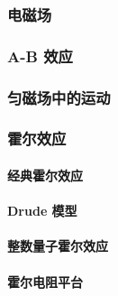 \documentclass[../../main.tex]{subfiles}
\begin{document}
\subsubsection{电磁场}
\subsubsection{A-B 效应}
\subsubsection{匀磁场中的运动}
\subsubsection{霍尔效应}
\paragraph{经典霍尔效应}
\paragraph{Drude 模型}
\paragraph{整数量子霍尔效应}
\paragraph{霍尔电阻平台}
\end{document}
